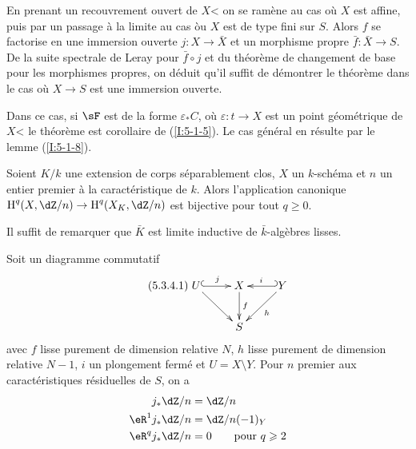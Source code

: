En prenant un recouvrement ouvert de $X$< on se ramène au cas où $X$ est 
affine, puis par un passage à la limite au cas òu $X$ est de type fini sur 
$S$. Alors $f$ se factorise en une immersion ouverte $j:X\to \bar X$ et un 
morphisme propre $\bar f:\bar X\to S$. De la suite spectrale de Leray pour 
$\bar f\circ j$ et du théorème de changement de base pour les morphismes 
propres, on déduit qu'il suffit de démontrer le théorème dans le cas 
où $X\to S$ est une immersion ouverte. 

Dans ce cas, si $\sF$ est de la forme $\varepsilon_* C$, où 
$\varepsilon:t\to X$ est un point géométrique de $X$< le théorème est 
corollaire de (\ref{I:5-1-5}). Le cas général en résulte par le lemme 
(\ref{I:5-1-8}). 





\begin{corollary}\label{I:5-3-3}
Soient $K/k$ une extension de corps séparablement clos, $X$ un $k$-schéma 
et $n$ un entier premier à la caractéristique de $k$. Alors l'application 
canonique $\h^q(X,\dZ/n) \to \h^q(X_K,\dZ/n)$ est bijective pour tout 
$q\geqslant 0$. 
\end{corollary}

Il suffit de remarquer que $\bar K$ est limite inductive de $\bar k$-algèbres 
lisses. 





\begin{theorem}\label{I:5-3-4}
Soit un diagramme commutatif 
\begin{equation*}\tag{5.3.4.1}\label{I:eq:5-3-4-1}\xymatrix{
  U \ar@{^{(}->}[r]^-j \ar[dr]
    & X \ar[d]^-f 
    & \ar@{_{(}->}[l]_-i Y \ar[dl]^-h \\
  & S
}\end{equation*}
avec $f$ lisse purement de dimension relative $N$, $h$ lisse purement de 
dimension relative $N-1$, $i$ un plongement fermé et $U=X\setminus Y$. Pour 
$n$ premier aux caractéristiques résiduelles de $S$, on a 
\begin{equation*}
\begin{aligned}
  j_* \dZ/n     &= \dZ/n \\
  \eR^1 j_*\dZ/n &= \dZ/n(-1)_Y \\
  \eR^q j_*\dZ/n &= 0 \qquad \text{pour $q\geqslant 2$}
\end{aligned}
\end{equation*}
\end{theorem}

